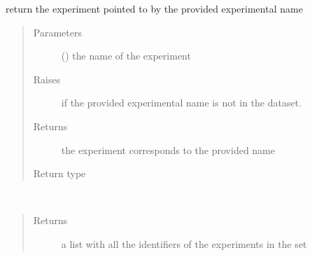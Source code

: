 \documentclass[letterpaper,10pt,english]{sphinxmanual}
\begin{document}
\begin{fulllineitems}

\begin{fulllineitems}
\label{\detokenize{IPTK.Classes:IPTK.Classes.ExperimentalSet.ExperimentSet.get_experiment}}
return the experiment pointed to by the provided experimental name
\begin{quote}\begin{description}
\item[{Parameters}] \leavevmode
{} () \textendash{} the name of the experiment

\item[{Raises}] \leavevmode
{} \textendash{} if the provided experimental name is not in the dataset.

\item[{Returns}] \leavevmode
the experiment corresponds to the provided name

\item[{Return type}] \leavevmode
{\hyperref[\detokenize{IPTK.Classes:IPTK.Classes.Experiment.Experiment}]{}}

\end{description}\end{quote}

\end{fulllineitems}


\begin{fulllineitems}
\label{\detokenize{IPTK.Classes:IPTK.Classes.ExperimentalSet.ExperimentSet.get_experimental_names}}~\begin{quote}\begin{description}
\item[{Returns}] \leavevmode
a list with all the identifiers of the experiments in the set


\end{description}
\end{quote}
\end{fulllineitems}
\end{fulllineitems}
\end{document}
